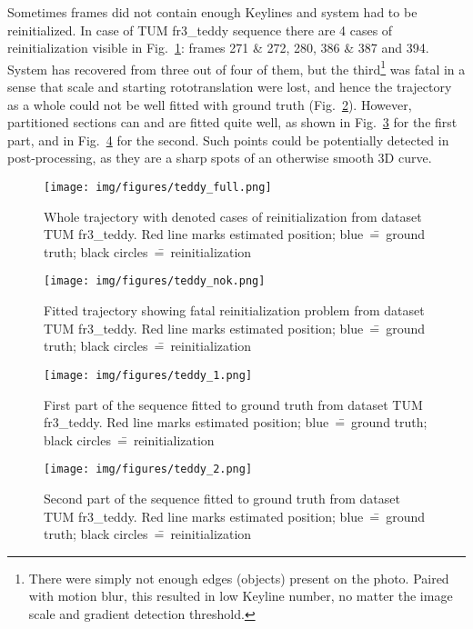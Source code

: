 Sometimes frames did not contain enough Keylines and system had to be reinitialized. In case of TUM fr3\_teddy sequence there are 4 cases of reinitialization visible in Fig.~\ref{fig:teddyfull}: frames 271 \& 272, 280, 386 \& 387 and 394. System has recovered from three out of four of them, but the third\footnote{There were simply not enough edges (objects) present on the photo. Paired with motion blur, this resulted in low Keyline number, no matter the image scale and gradient detection threshold.} was fatal in a sense that scale and starting rototranslation were lost, and hence the trajectory as a whole could not be well fitted with ground truth (Fig.~\ref{fig:teddynok}). However, partitioned sections can and are fitted quite well, as shown in Fig.~\ref{fig:teddy1} for the first part, and in Fig.~\ref{fig:teddy2} for the second. Such points could be potentially detected in post-processing, as they are a sharp spots of an otherwise smooth 3D curve.

\begin{figure}[ht]
	\centering\texttt{[image: img/figures/teddy\_full.png]}
	\caption{ Whole trajectory with denoted cases of reinitialization from dataset TUM fr3\_teddy. Red line marks estimated position; blue~\==~ground truth; black circles~\==~reinitialization }
	\label{fig:teddyfull}
\end{figure}
\begin{figure}[ht]
	\centering\texttt{[image: img/figures/teddy\_nok.png]}
	\caption{ Fitted trajectory showing fatal reinitialization problem from dataset TUM fr3\_teddy. Red line marks estimated position; blue~\==~ground truth; black circles~\==~reinitialization }
	\label{fig:teddynok}
\end{figure}
\begin{figure}[ht]
	\centering\texttt{[image: img/figures/teddy\_1.png]}
	\caption{ First part of the sequence fitted to ground truth from dataset TUM fr3\_teddy. Red line marks estimated position; blue~\==~ground truth; black circles~\==~reinitialization }
	\label{fig:teddy1}
\end{figure}
\begin{figure}[ht]
	\centering\texttt{[image: img/figures/teddy\_2.png]}
	\caption{ Second part of the sequence fitted to ground truth from dataset TUM fr3\_teddy. Red line marks estimated position; blue~\==~ground truth; black circles~\==~reinitialization }
	\label{fig:teddy2}
\end{figure}

